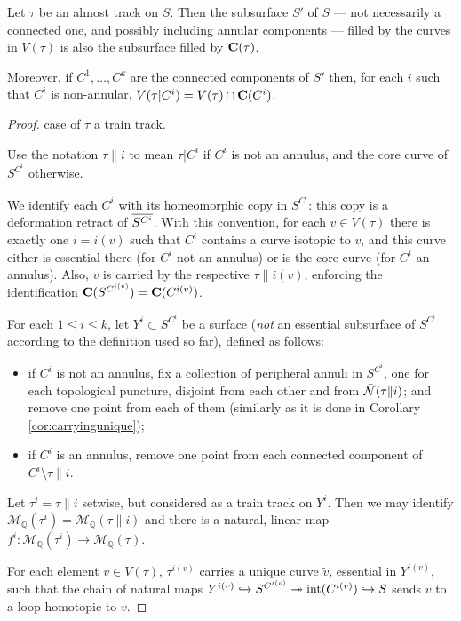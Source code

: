\begin{lemma}\label{lem:decreasingfilling}
Let $\tau$ be an almost track on $S$. Then the subsurface $S'$ of $S$ --- not necessarily a connected one, and possibly including annular components --- filled by the curves in $V(\tau)$ is also the subsurface filled by $\mathbf C(\tau)$.

Moreover, if $C^1,\ldots, C^k$ are the connected components of $S'$ then, for each $i$ such that $C^i$ is non-annular, $V(\tau|C^i)=V(\tau)\cap\mathbf C(C^i)$.
\end{lemma}

\begin{proof}
 case of $\tau$ a train track.

Use the notation $\tau\|i$ to mean $\tau|C^i$ if $C^i$ is not an annulus, and the core curve of $S^{C^i}$ otherwise.

We identify each $C^i$ with its homeomorphic copy in $S^{C^i}$: this copy is a deformation retract of $\overline{S^{C^i}}$. With this convention, for each $v\in V(\tau)$ there is exactly one $i=i(v)$ such that $C^i$ contains a curve isotopic to $v$, and this curve either is essential there (for $C^i$ not an annulus) or is the core curve (for $C^i$ an annulus). Also, $v$ is carried by the respective $\tau\|i(v)$, enforcing the identification $\mathbf C(S^{C^{i(v)}})=\mathbf C(C^{i(v)})$.

For each $1\leq i\leq k$, let $Y^i\subset S^{C^i}$ be a surface (\emph{not} an essential subsurface of $S^{C^i}$ according to the definition used so far), defined as follows:
\begin{itemize}
\item if $C^i$ is not an annulus, fix a collection of peripheral annuli in $S^{C^i}$, one for each topological puncture, disjoint from each other and from $\bar{{\mathcal N}}(\tau\|i)$; and remove one point from each of them (similarly as it is done in Corollary \ref{cor:carryingunique});
\item if $C^i$ is an annulus, remove one point from each connected component of $C^i\setminus \tau\|i$.
\end{itemize}
 
Let $\tau^i=\tau\|i$ setwise, but considered as a train track on $Y^i$. Then we may identify ${\mathcal M}_{\mathbb Q}(\tau^i)={\mathcal M}_{\mathbb Q}(\tau\|i)$ and there is a natural, linear map $f^i:{\mathcal M}_{\mathbb Q}(\tau^i)\rightarrow {\mathcal M}_{\mathbb Q}(\tau)$.

For each element $v \in V(\tau)$, $\tau^{i(v)}$ carries a unique curve $\tilde v$, essential in $Y^{i(v)}$, such that the chain of natural maps $Y^{i(v)}\hookrightarrow S^{C^{i(v)}} \twoheadrightarrow \mathrm{int}(C^{i(v)})\hookrightarrow S$ sends $\tilde v$ to a loop homotopic to $v$.


\end{proof}
